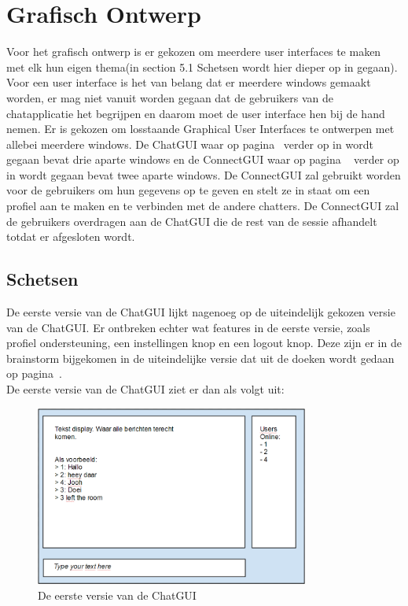 \documentclass[12pt]{article}
\begin{document}
\section{Grafisch Ontwerp}
\label{aangegeven}
Voor het grafisch ontwerp is er gekozen om meerdere user interfaces te maken met elk hun eigen thema(in section 5.1 Schetsen wordt hier dieper op in gegaan). Voor een user interface is het van belang dat er meerdere windows gemaakt worden, er mag niet vanuit worden gegaan dat de gebruikers van de chatapplicatie het begrijpen en daarom moet de user interface hen bij de hand nemen.  Er is gekozen om losstaande Graphical User Interfaces te ontwerpen met allebei meerdere windows. De ChatGUI waar op pagina~\pageref{ChatGUI} verder op in wordt gegaan bevat drie aparte windows en de ConnectGUI waar op pagina ~\pageref{ConnectGUI} verder op in wordt gegaan bevat twee aparte windows. De ConnectGUI zal gebruikt worden voor de gebruikers om hun gegevens op te geven en stelt ze in staat om een profiel aan te maken en te verbinden met de andere chatters. De ConnectGUI zal de gebruikers overdragen aan de ChatGUI die de rest van de sessie afhandelt totdat er afgesloten wordt.

\subsection{Schetsen}
De eerste versie van de ChatGUI lijkt nagenoeg op de uiteindelijk gekozen versie van de ChatGUI. Er ontbreken echter wat features in de eerste versie, zoals profiel ondersteuning, een instellingen knop en een  logout knop. Deze zijn er in de brainstorm bijgekomen in de uiteindelijke versie dat uit de doeken wordt gedaan op pagina~\pageref{Chat Window}. \\
De eerste versie van de ChatGUI ziet er dan als volgt uit:
\begin{figure}[ht]
\begin{center}
\includegraphics[width =90mm]{ChGDv1}
\caption{De eerste versie van de ChatGUI}
\label{figure001}
\end{center}
\end{figure}
\\
\end{document}
